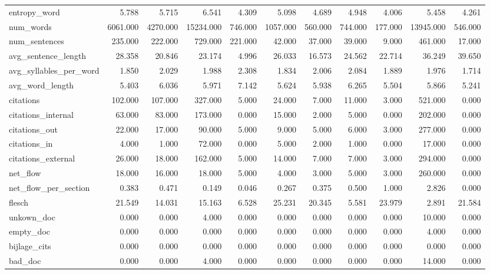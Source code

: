 \begin{tabular}{lrrrrrrrrrr}
\cline{1-11}
entropy\_word & 5.788 & 5.715 & 6.541 & 4.309 & 5.098 & 4.689 & 4.948 & 4.006 & 5.458 & 4.261 \\
\cline{1-11}
num\_words & 6061.000 & 4270.000 & 15234.000 & 746.000 & 1057.000 & 560.000 & 744.000 & 177.000 & 13945.000 & 546.000 \\
\cline{1-11}
num\_sentences & 235.000 & 222.000 & 729.000 & 221.000 & 42.000 & 37.000 & 39.000 & 9.000 & 461.000 & 17.000 \\
\cline{1-11}
avg\_sentence\_length & 28.358 & 20.846 & 23.174 & 4.996 & 26.033 & 16.573 & 24.562 & 22.714 & 36.249 & 39.650 \\
\cline{1-11}
avg\_syllables\_per\_word & 1.850 & 2.029 & 1.988 & 2.308 & 1.834 & 2.006 & 2.084 & 1.889 & 1.976 & 1.714 \\
\cline{1-11}
avg\_word\_length & 5.403 & 6.036 & 5.971 & 7.142 & 5.624 & 5.938 & 6.265 & 5.504 & 5.866 & 5.241 \\
\cline{1-11}
citations & 102.000 & 107.000 & 327.000 & 5.000 & 24.000 & 7.000 & 11.000 & 3.000 & 521.000 & 0.000 \\
\cline{1-11}
citations\_internal & 63.000 & 83.000 & 173.000 & 0.000 & 15.000 & 2.000 & 5.000 & 0.000 & 202.000 & 0.000 \\
\cline{1-11}
citations\_out & 22.000 & 17.000 & 90.000 & 5.000 & 9.000 & 5.000 & 6.000 & 3.000 & 277.000 & 0.000 \\
\cline{1-11}
citations\_in & 4.000 & 1.000 & 72.000 & 0.000 & 5.000 & 2.000 & 1.000 & 0.000 & 17.000 & 0.000 \\
\cline{1-11}
citations\_external & 26.000 & 18.000 & 162.000 & 5.000 & 14.000 & 7.000 & 7.000 & 3.000 & 294.000 & 0.000 \\
\cline{1-11}
net\_flow & 18.000 & 16.000 & 18.000 & 5.000 & 4.000 & 3.000 & 5.000 & 3.000 & 260.000 & 0.000 \\
\cline{1-11}
net\_flow\_per\_section & 0.383 & 0.471 & 0.149 & 0.046 & 0.267 & 0.375 & 0.500 & 1.000 & 2.826 & 0.000 \\
\cline{1-11}
flesch & 21.549 & 14.031 & 15.163 & 6.528 & 25.231 & 20.345 & 5.581 & 23.979 & 2.891 & 21.584 \\
\cline{1-11}
unkown\_doc & 0.000 & 0.000 & 4.000 & 0.000 & 0.000 & 0.000 & 0.000 & 0.000 & 10.000 & 0.000 \\
\cline{1-11}
empty\_doc & 0.000 & 0.000 & 0.000 & 0.000 & 0.000 & 0.000 & 0.000 & 0.000 & 4.000 & 0.000 \\
\cline{1-11}
bijlage\_cits & 0.000 & 0.000 & 0.000 & 0.000 & 0.000 & 0.000 & 0.000 & 0.000 & 0.000 & 0.000 \\
\cline{1-11}
bad\_doc & 0.000 & 0.000 & 4.000 & 0.000 & 0.000 & 0.000 & 0.000 & 0.000 & 14.000 & 0.000 \\
\cline{1-11}
\bottomrule
\end{tabular}
